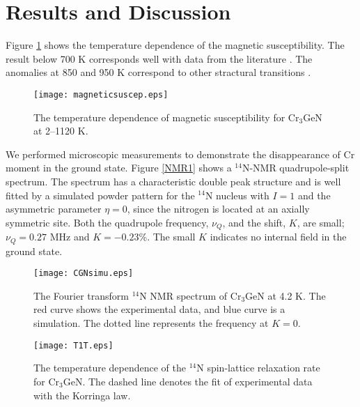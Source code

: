 \documentclass[a4paper]{jpconf}
\newcommand{\CGN}{\mathrm{Cr_3GeN}}
\newcommand{\Nitnuc}{^{14}\mathrm{N}}
\begin{document}





\section{Results and Discussion} 
Figure \ref{suscep} shows the temperature dependence of the magnetic susceptibility. The result below 700 K corresponds well with data from the literature \cite{Nardin1, Lin}. The anomalies at 850 and 950 K correspond to other stractural transitions \cite{Wang}.


\begin{figure}[h]
	\centering
	\texttt{[image: magneticsuscep.eps]}
	\caption{The temperature dependence of magnetic susceptibility for $\CGN$ at 2--1120 K.}
	\label{suscep}
\end{figure}


We performed microscopic measurements to demonstrate the disappearance of Cr moment in the ground state.
Figure \ref{NMR1} shows a $\Nitnuc$-NMR quadrupole-split spectrum.
The spectrum has a characteristic double peak structure and is well fitted by a simulated powder pattern for the $\Nitnuc$ nucleus with $I =1$ and the asymmetric parameter $\eta = 0$, since the nitrogen is located at an axially symmetric site. 
Both the quadrupole frequency, $\nu_Q$, and the shift, $K$, are small; $\nu_Q = 0.27$ MHz and $K = -0.23$\%. The small $K$ indicates no internal field in the ground state. 

\begin{figure}[h]
\begin{minipage}[t]{16pc}
	\texttt{[image: CGNsimu.eps]}
	\caption{\label{NMR1} The Fourier transform $\Nitnuc$ NMR spectrum of $\CGN$ at 4.2 K. The red curve shows the experimental data, and blue curve is a simulation. The dotted line represents the frequency at $K = 0$.}
\end{minipage}\hspace{2pc}%
\begin{minipage}[t]{16pc}
	\texttt{[image: T1T.eps]}
	\caption{\label{NMR2} The temperature dependence of the $\Nitnuc$ spin-lattice relaxation rate for $\CGN$. The dashed line denotes the fit of experimental data with the Korringa law. }
\end{minipage}
\end{figure}
\end{document}
